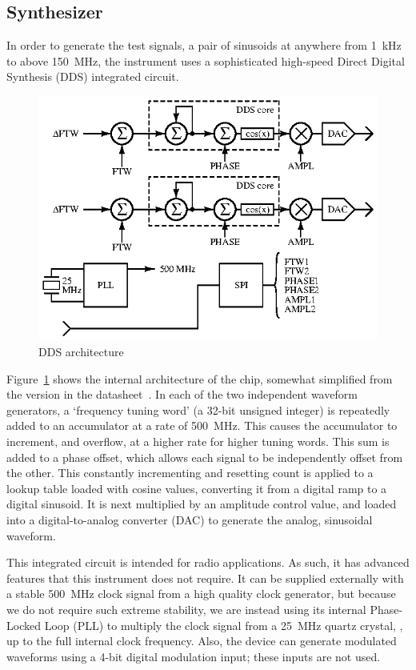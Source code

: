 \subsection{Synthesizer}


In order to generate the test signals, a pair of sinusoids at anywhere from
1~kHz to above 150~MHz, the instrument uses a sophisticated
high-speed Direct Digital Synthesis (DDS) integrated circuit.

\begin{figure}[H]
\centering
\includegraphics{dds}
\caption{DDS architecture}
\label{fig:dds}
\end{figure}

Figure~\ref{fig:dds} shows the internal architecture of the chip, somewhat
simplified from the version in the datasheet~\cite{ad9958}. In each of the two
independent waveform generators, a `frequency tuning word' (a 32-bit unsigned
integer) is repeatedly added to an accumulator at a rate of 500~MHz.
This causes the accumulator to increment, and overflow, at a higher rate for
higher tuning words. This sum is added to a phase offset, which allows each
signal to be independently offset from the other. This constantly incrementing
and resetting count is applied to a lookup table loaded with cosine values,
converting it from a digital ramp to a digital sinusoid. It is next multiplied
by an amplitude control value, and loaded into a digital-to-analog converter
(DAC) to generate the analog, sinusoidal waveform.

This integrated circuit is intended for radio applications. As such, it has
advanced features that this instrument does not require. It can be supplied
externally with a stable 500~MHz clock signal from a high quality
clock generator, but because we do not require such extreme stability, we
are instead using its internal Phase-Locked Loop (PLL) to multiply the clock
signal from a 25~MHz quartz crystal, , up to the full
internal clock frequency. Also, the device can generate modulated waveforms
using a 4-bit digital modulation input; these inputs are not used.

